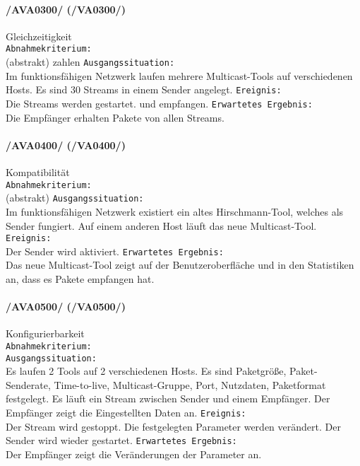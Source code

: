 \paragraph{/AVA0300/ (/VA0300/)} Gleichzeitigkeit\\  %
\texttt{Abnahmekriterium:} \\(abstrakt)
zahlen \texttt{Ausgangssituation:} \\Im funktionsfähigen Netzwerk laufen mehrere
Multicast-Tools auf verschiedenen Hosts. Es sind 30 Streams in einem
Sender angelegt. 
\texttt{Ereignis:} \\Die Streams werden gestartet.
und empfangen. 
\texttt{Erwartetes Ergebnis:} \\Die Empfänger erhalten Pakete von allen Streams.

\paragraph{/AVA0400/ (/VA0400/)} Kompatibilität\\ %
\texttt{Abnahmekriterium:} \\(abstrakt)
\texttt{Ausgangssituation:} \\Im funktionsfähigen Netzwerk existiert ein altes
Hirschmann-Tool, welches als Sender fungiert. Auf einem anderen Host
läuft das neue Multicast-Tool. 
\texttt{Ereignis:} \\Der Sender wird aktiviert.
\texttt{Erwartetes Ergebnis:} \\Das neue Multicast-Tool zeigt auf der
Benutzeroberfläche und in den Statistiken an, dass es Pakete empfangen hat.

\paragraph{/AVA0500/ (/VA0500/)} Konfigurierbarkeit\\ %
\texttt{Abnahmekriterium:} \\ %
\texttt{Ausgangssituation:} \\Es laufen 2 Tools auf 2 verschiedenen Hosts. 
Es sind  Paketgröße, Paket-Senderate, Time-to-live,
Multicast-Gruppe, Port, Nutzdaten, Paketformat festgelegt. Es läuft ein Stream
zwischen Sender und einem Empfänger. Der Empfänger zeigt die Eingestellten Daten
an. 
\texttt{Ereignis:} \\Der Stream wird gestoppt. Die festgelegten Parameter werden
verändert. Der Sender wird wieder gestartet.
\texttt{Erwartetes Ergebnis:} \\Der Empfänger zeigt die Veränderungen der
Parameter an.

